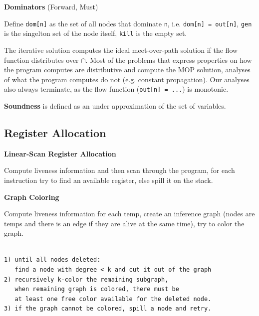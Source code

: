 \textbf{Dominators} (Forward, Must)\medskip

Define \texttt{dom[n]} as the set of all nodes that dominate \texttt{n}, i.e. \texttt{dom[n] = out[n]}, \texttt{gen} is the singelton set of the node itself, \texttt{kill} is the empty set.\medskip

The iterative solution computes the ideal meet-over-path solution if the flow function distributes over $\cap$. Most of the problems that express properties on how the program computes are distributive and compute the MOP solution, analyses of what the program computes do not (e.g. constant propagation). Our analyses also always terminate, as the flow function (\texttt{out[n] = ...}) is monotonic.\medskip

\textbf{Soundness} is defined as an under approximation of the set of variables.


\subsection*{Register Allocation}

\textbf{Linear-Scan Register Allocation}\medskip

Compute liveness information and then scan through the program, for each instruction try to find an available register, else spill it on the stack.\medskip

\textbf{Graph Coloring}\medskip

Compute liveness information for each temp, create an inference graph (nodes are temps and there is an edge if they are alive at the same time), try to color the graph.\medskip

\begin{algorithm}
\begin{verbatim}
    
1) until all nodes deleted: 
   find a node with degree < k and cut it out of the graph
2) recursively k-color the remaining subgraph, 
   when remaining graph is colored, there must be 
   at least one free color available for the deleted node.
3) if the graph cannot be colored, spill a node and retry.
\end{verbatim}
\end{algorithm}

